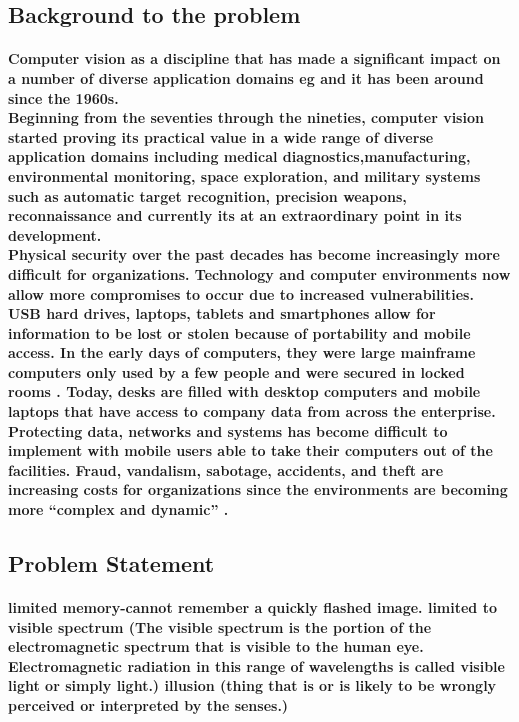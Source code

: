 \documentclass[11pt]{article}
\begin{document}
	 \subsection{\textbf{Background to the problem}}
	  \paragraph{\textmd{Computer vision as a discipline that has made
	 a significant impact on a number of diverse application domains eg \cite{DUMMY:1} and it has been around since the 1960s.\\ Beginning from the seventies through the nineties, computer vision started proving its practical value in a wide range of diverse application domains including medical diagnostics,manufacturing, environmental monitoring, space exploration, and military systems such as automatic target recognition, precision weapons, reconnaissance\cite{DUMMY:3} and currently its at an extraordinary point in its development.\\Physical security over  the past decades has become increasingly more difficult for organizations. Technology and computer environments now allow more compromises to occur
	 due to increased vulnerabilities. USB hard drives, laptops, tablets and smartphones allow for information to be lost or stolen because of portability and mobile access. In the early days of
	 computers, they were large mainframe computers only used by a few people and were secured in locked rooms \cite{DUMMY:2}. Today, desks are filled with desktop computers and mobile laptops that have access to company data from across the enterprise. Protecting data, networks and systems has become difficult to implement with mobile users able to take their computers out of the facilities. Fraud, vandalism, sabotage, accidents, and theft are increasing costs for organizations since the environments are becoming more “complex and dynamic” \cite{DUMMY:2}.}}
	  
	 \subsection{\textbf{Problem Statement}}
	 
	 \paragraph{\textmd{limited memory-cannot remember a quickly flashed image. 
	 limited to visible spectrum (The visible spectrum is the portion of the electromagnetic spectrum that is visible to the human eye. Electromagnetic radiation in this range of wavelengths is called visible light or simply light.)	
	 illusion (thing that is or is likely to be wrongly perceived or interpreted by the senses.)}}
	 
\end{document}
